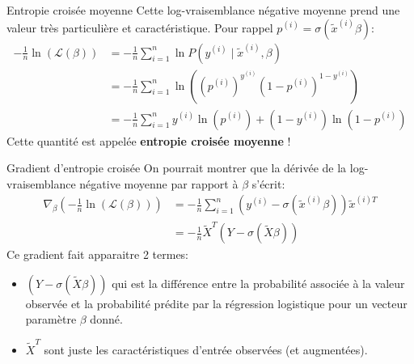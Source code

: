 \begin{frame}{Entropie croisée moyenne}
	Cette log-vraisemblance négative moyenne prend une valeur très particulière et caractéristique. Pour rappel $p^{(i)} = \sigma(\tilde{x}^{(i)} \beta)$:
	\begin{equation}
		\begin{aligned}
			-\frac{1}{n} \ln{\left(\mathcal{L}(\beta)\right)} 
			&= - \frac{1}{n} \sum_{i=1}^n \ln{P(y^{(i)} \mid \tilde{x}^{(i)}, \beta)} \\
			&= - \frac{1}{n} \sum_{i=1}^n \ln{\left(\left(p^{(i)}\right)^{y^{(i)}} \left(1 - p^{(i)}\right)^{1 - y^{(i)}}\right)} \\
			&= - \frac{1}{n} \sum_{i=1}^n y^{(i)} \ln{\left(p^{(i)}\right)} + (1 - y^{(i)}) \ln{\left(1 - p^{(i)}\right)}
		\end{aligned}
		\nonumber
	\end{equation}
	Cette quantité est appelée \textbf{entropie croisée moyenne} !
\end{frame}

\begin{frame}{Gradient d'entropie croisée}
	On pourrait montrer que la dérivée de la log-vraisemblance négative moyenne par rapport à $\beta$ s'écrit:
	\begin{equation}
		\begin{aligned}
			\nabla_{\beta}\left(- \frac{1}{n} \ln{\left(\mathcal{L}(\beta)\right)}\right) 
			&= - \frac{1}{n} \sum_{i=1}^n \left(y^{(i)} - \sigma(\tilde{x}^{(i)} \beta)\right) \tilde{x}^{(i)T} \\
			&= - \frac{1}{n} \tilde{X}^T \left(Y - \sigma\left(\tilde{X} \beta\right)\right)
		\end{aligned}
		\nonumber
	\end{equation}
	Ce gradient fait apparaitre 2 termes:
	\begin{itemize}
		\item $\left(Y - \sigma\left(\tilde{X} \beta\right)\right)$ qui est la différence entre la probabilité associée à la valeur observée et la probabilité prédite par la régression logistique pour un vecteur paramètre $\beta$ donné.
		\item $\tilde{X}^T$ sont juste les caractéristiques d'entrée observées (et augmentées).
	\end{itemize}
\end{frame}

